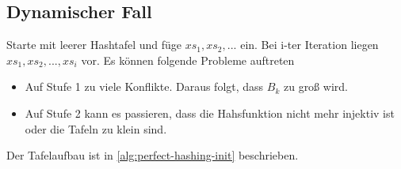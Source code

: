             \subsection{Dynamischer Fall}
                Starte mit leerer Hashtafel und füge $xs_1,xs_2,...$ ein. Bei i-ter Iteration liegen $xs_1,xs_2,...,xs_i$ vor. Es können folgende Probleme auftreten
                \begin{itemize}
                    \item Auf Stufe 1 zu viele Konflikte. Daraus folgt, dass $B_k$ zu groß wird.
                    \item Auf Stufe 2 kann es passieren, dass die Hahsfunktion nicht mehr injektiv ist oder die Tafeln zu klein sind.
                \end{itemize}
                Der Tafelaufbau ist in \autoref{alg:perfect-hashing-init} beschrieben.
